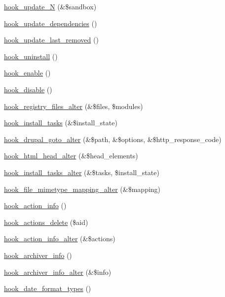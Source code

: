\begin{DoxyCompactItemize}
\hyperlink{group__hooks_ga908950689e6b85cd0fae3b780d69a41f}{hook\_\-update\_\-N} (\&\$sandbox)
\item 
\hyperlink{group__hooks_ga23e9e019b7ec64d95bafbeaffd295483}{hook\_\-update\_\-dependencies} ()
\item 
\hyperlink{group__hooks_ga2fc0f6e61d252afa19e87804dbfdb558}{hook\_\-update\_\-last\_\-removed} ()
\item 
\hyperlink{group__hooks_ga3fb24f6923b3e585d6326ff5abdcc57c}{hook\_\-uninstall} ()
\item 
\hyperlink{group__hooks_gaedcfb58c08d5c5f8ffcd1059ceeb39e4}{hook\_\-enable} ()
\item 
\hyperlink{group__hooks_ga5872573d2180aa4b306e7d6c08a74c10}{hook\_\-disable} ()
\item 
\hyperlink{group__hooks_ga5b1201bb1afca26333900cd9aca6a2de}{hook\_\-registry\_\-files\_\-alter} (\&\$files, \$modules)
\item 
\hyperlink{group__hooks_gafcb418f1e1f7c8acb94ffa12d6bef79f}{hook\_\-install\_\-tasks} (\&\$install\_\-state)
\item 
\hyperlink{group__hooks_ga3c043f34f18e1c77daa341038a28e1ba}{hook\_\-drupal\_\-goto\_\-alter} (\&\$path, \&\$options, \&\$http\_\-response\_\-code)
\item 
\hyperlink{group__hooks_ga0769a87ac64497be6b87aea2b640839c}{hook\_\-html\_\-head\_\-alter} (\&\$head\_\-elements)
\item 
\hyperlink{group__hooks_ga71d761aa86808ce445157b271cb77a25}{hook\_\-install\_\-tasks\_\-alter} (\&\$tasks, \$install\_\-state)
\item 
\hyperlink{group__hooks_gaac5bb0122941c0b10df08d65ec358e99}{hook\_\-file\_\-mimetype\_\-mapping\_\-alter} (\&\$mapping)
\item 
\hyperlink{group__actions_ga3df26c5d6496c91fcd0edd8648023fb4}{hook\_\-action\_\-info} ()
\item 
\hyperlink{group__hooks_ga21102314b21e33695c3967922b4d9efe}{hook\_\-actions\_\-delete} (\$aid)
\item 
\hyperlink{group__hooks_ga141677d430a340c375bea9e1098a7a82}{hook\_\-action\_\-info\_\-alter} (\&\$actions)
\item 
\hyperlink{group__hooks_ga1c5bd8d11e7d54242528f85434e5b260}{hook\_\-archiver\_\-info} ()
\item 
\hyperlink{group__hooks_ga4e6f6f94acbd7a21c4a4a2cc6916356d}{hook\_\-archiver\_\-info\_\-alter} (\&\$info)
\item 
\hyperlink{group__hooks_gaadde7af71d0b4f827cf7aac1c88c4d23}{hook\_\-date\_\-format\_\-types} ()

\end{DoxyCompactItemize}
